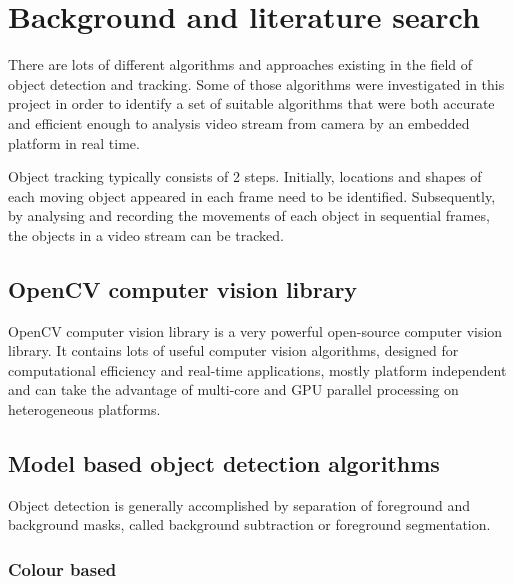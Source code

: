 \chapter{Background and literature search}

There are lots of different algorithms and approaches existing in the field of object detection and tracking. Some of those algorithms were investigated in this project in order to identify a set of suitable algorithms that were both accurate and efficient enough to analysis video stream from camera by an embedded platform in real time.

Object tracking typically consists of 2 steps. Initially, locations and shapes of each moving object appeared in each frame need to be identified. Subsequently, by analysing and recording the movements of each object in sequential frames, the objects in a video stream can be tracked.

\section{OpenCV computer vision library}


OpenCV computer vision library \cite{opencv} is a very powerful open-source computer vision library. It contains lots of useful computer vision algorithms, designed for computational efficiency and real-time applications, mostly platform independent and can take the advantage of multi-core and GPU parallel processing on heterogeneous platforms.

\section{Model based object detection algorithms}

\iffalse
Being able to detect objects in a video frame is the first, also the most important and challenging step to do object tracking. This is generally accomplished by separation of foreground objects and background image.
\fi

Object detection is generally accomplished by separation of foreground and background masks, called background subtraction or foreground segmentation.

\subsection{Colour based}
\label{bgs:colour}

